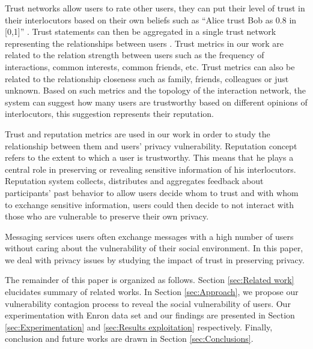 Trust networks allow users to rate other users,
	they can put their level of trust in their interlocutors based on their own beliefs such as “Alice trust Bob as 0.8 in [0,1]” \cite{massa_trustaware_2007}.
Trust statements can then be aggregated in a single trust network representing the relationships between users \cite{massa_trustaware_2007}.
Trust metrics in our work are related to the relation strength between users such as the frequency of interactions,
	common interests,
	common friends, etc.
Trust metrics can also be related to the relationship closeness such as family,
	friends,
	colleagues or just unknown.
Based on such metrics and the topology of the interaction network,
	the system can suggest how many users are trustworthy based on different opinions of interlocutors,
	this suggestion represents their reputation.

Trust and reputation metrics are used in our work in order to study the relationship between them and users' privacy vulnerability.
Reputation concept refers to the extent to which a user is trustworthy.
This means that he plays a central role in preserving or revealing sensitive information of his interlocutors.
Reputation system collects,
	distributes and aggregates feedback about participants’ past behavior to allow users decide whom to trust and with whom to exchange sensitive information,
	users could then decide to not interact with those who are vulnerable to preserve their own privacy.

Messaging services users often exchange messages with a high number of users without caring about the vulnerability of their social environment.
In this paper,
	we deal with privacy issues by studying the impact of trust in preserving privacy.

The remainder of this paper is organized as follows.
Section \ref{sec:Related work} elucidates summary of related works.
In Section \ref{sec:Approach},
	we propose our vulnerability contagion process to reveal the social vulnerability of users.
Our experimentation with Enron data set and our findings are presented in Section \ref{sec:Experimentation} and \ref{sec:Results exploitation} respectively.
Finally,
	conclusion and future works are drawn in Section \ref{sec:Conclusions}.


